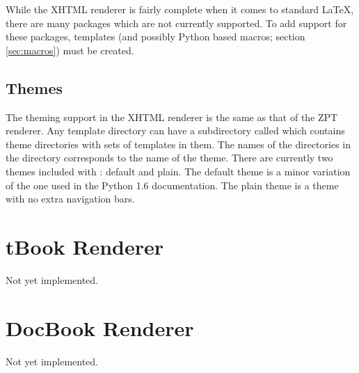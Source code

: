 While the XHTML renderer is fairly complete when it comes to standard
\LaTeX, there are many packages which are not currently supported.
To add support for these packages, templates (and possibly Python
based macros; section \ref{sec:macros}) must be created.


\subsection{Themes}

The theming support in the XHTML renderer is the same as that of the
ZPT renderer.  Any template directory can have a subdirectory called
 which contains theme directories with sets of templates
in them.  The names of the directories in the  directory
corresponds to the name of the theme.  There are currently two themes
included with \plasTeX: default and plain.  The default theme is a
minor variation of the one used in the Python 1.6 documentation.  The
plain theme is a theme with no extra navigation bars. 


\section{tBook Renderer}

Not yet implemented.

\section{DocBook Renderer}

Not yet implemented.

